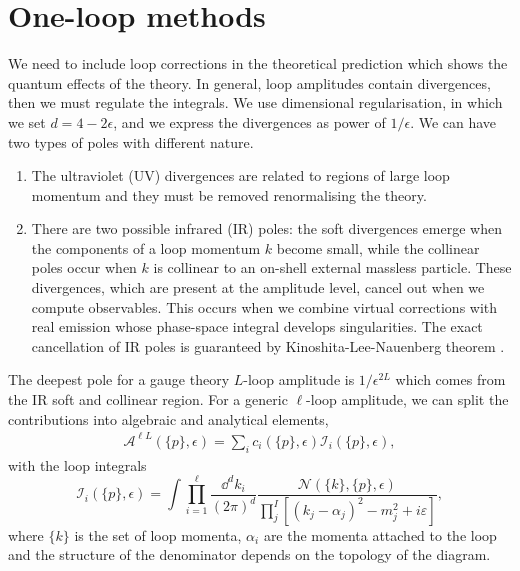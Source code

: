 \section{One-loop methods}
We need to include loop corrections in the theoretical prediction which shows the quantum effects of the theory. 
In general, loop amplitudes contain divergences, then we must regulate the integrals. We use dimensional regularisation, in which we set $d=4-2\epsilon$, and we express the divergences as power of $1/\epsilon$. We can have two types of poles with different nature.
\begin{enumerate}
	\item The ultraviolet (UV) divergences are related to regions of large loop momentum and they must be removed renormalising the theory.
	\item There are two possible infrared (IR) poles: the soft divergences emerge when the components of a loop momentum $k$ become small, while the collinear poles occur when $k$ is collinear to an on-shell external massless particle. These divergences, which are present at the amplitude level, cancel out when we compute observables. This occurs when we combine virtual corrections with real emission whose phase-space integral develops singularities. The exact cancellation of IR poles is guaranteed by Kinoshita-Lee-Nauenberg theorem \cite{Kinoshita:1962ur,Lee:1964is}.
\end{enumerate}
The deepest pole for a gauge theory $L$-loop amplitude is $1/\epsilon^{2L}$ which comes from the IR soft and collinear region.
For a generic $\ell$-loop amplitude, we can split the contributions into algebraic and analytical elements,
\begin{align*}
	\mathcal{A}^{\ell L}(\{p\},\epsilon)=\sum_i c_i(\{p\},\epsilon) \mathcal{I}_i(\{p\},\epsilon),
\end{align*}
with the loop integrals
$$
	\mathcal{I}_i(\{p\},\epsilon)=\int \prod_{i=1}^\ell \frac{\dd^d k_i}{(2\pi)^d}\frac{\mathcal{N}(\{k\},\{p\},\epsilon)}{\prod_j^I \left[(k_j-\alpha_j)^2-m_j^2+i\varepsilon\right]},
$$
where $\{k\}$ is the set of loop momenta, $\alpha_i$ are the momenta attached to the loop and the structure of the denominator depends on the topology of the diagram.
